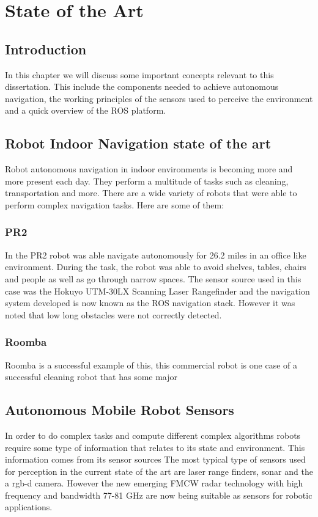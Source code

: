 \chapter{State of the Art} \label{ch:Concepts}

\section{Introduction}
In this chapter we will discuss some important concepts relevant to this dissertation. This include the components needed to achieve autonomous navigation, the working principles of the sensors used to perceive the environment and a quick overview of the \ac{ROS} platform.
\section{Robot Indoor Navigation state of the art}
Robot autonomous navigation in indoor environments is becoming more and more present each day. They perform a multitude of tasks such as cleaning, transportation and more. There are a wide variety of robots that were able to perform complex navigation tasks. Here are some of them:
\subsection{PR2}
In  \cite{marder2010office}  the PR2 robot was able navigate autonomously for 26.2 miles in an office like environment. During the task, the robot was able to avoid  shelves, tables, chairs and people as well as go
through narrow spaces. The sensor source used in this case was the Hokuyo UTM-30LX Scanning Laser Rangefinder and the navigation system developed is now known as the \ac{ROS} navigation stack. However it was noted that low long obstacles were not correctly detected.

\subsection{Roomba}
Roomba is a successful  example of this, this   commercial robot is one case of a successful cleaning robot that has some major 

\section{Autonomous Mobile Robot Sensors}

In order to do complex tasks and compute different complex algorithms robots require some type of information that relates to its state and environment. This information comes from its sensor sources
The most typical type of sensors used for perception in the current state of the art are laser range finders, sonar and the a rgb-d camera. However the new emerging \ac{FMCW} radar technology with high frequency and bandwidth 77-81 GHz are now being suitable as sensors for robotic applications.
